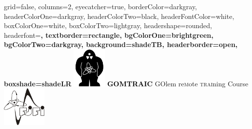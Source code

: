 \documentclass[a4paper,portrait,fontscale=0.65]{baposter}
\begin{document}


\begin{poster}{
	grid=false,
        columns=2,
	eyecatcher=true, 
	borderColor=darkgray,
	headerColorOne=darkgray,
	headerColorTwo=black,
	headerFontColor=white,
	boxColorOne=white,
        boxColorTwo=lightgray,
	headershape=rounded,
	headerfont=\Large\sf\bf,
	textborder=rectangle,
        bgColorOne=brightgreen,
        bgColorTwo=darkgray,
	background=shadeTB,
	headerborder=open,
  boxshade=shadeLR
}
{
  \includegraphics[height=2cm]{golem}
}
{
\textcolor{black}{\Huge\textbf{\textsc{GOMTRAIC}}}\vspace{0.5em}
}
{
 \textsc{GO}lem re\textsc{m}ote \textsc{trai}ning \textsc{C}ourse
}
{
\includegraphics[height=2cm]{fjfi.png}
}


\end{poster}
\end{document}
